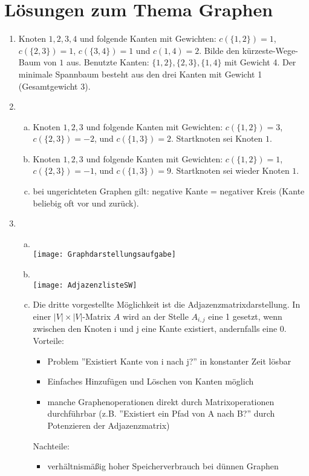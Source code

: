 \documentclass{scrartcl}
\begin{document}
\section*{Lösungen zum Thema Graphen}
\begin{enumerate}[(1)]

\item Knoten $1,2,3,4$ und folgende Kanten mit Gewichten: $c(\{1,2\})=1$, $c(\{2,3\})=1$, $c(\{3,4\})=1$ und $c({1,4})=2$.
Bilde den k\"urzeste-Wege-Baum von $1$ aus. Benutzte Kanten: $\{1,2\}, \{2,3\}, \{1,4\}$ mit Gewicht 4.
Der minimale Spannbaum besteht aus den drei Kanten mit Gewicht 1 (Gesamtgewicht 3).

\item \begin{enumerate}[(a)]
\item Knoten $1,2,3$ und folgende Kanten mit Gewichten: $c(\{1,2\})=3$, $c(\{2,3\})=-2$, und $c(\{1,3\})=2$. Startknoten sei Knoten $1$.
\item Knoten $1,2,3$ und folgende Kanten mit Gewichten: $c(\{1,2\})=1$, $c(\{2,3\})=-1$, und $c(\{1,3\})=9$. Startknoten sei wieder Knoten $1$.
\item bei ungerichteten Graphen gilt: negative Kante = negativer Kreis (Kante beliebig oft vor und zur\"uck).
\end{enumerate}

\item \begin{enumerate}[(a)]
	\item \ \\ \texttt{[image: Graphdarstellungsaufgabe]}
	\item \ \\ \texttt{[image: AdjazenzlisteSW]}
	\item Die dritte vorgestellte Möglichkeit ist die Adjazenzmatrixdarstellung. In einer $|V| \times |V|$-Matrix $A$ wird an der Stelle $A_{i,j}$ eine 1 gesetzt, wenn zwischen den Knoten i und j eine Kante existiert, andernfalls eine 0.\\
	Vorteile:
	\begin{itemize}
		\item Problem ''Existiert Kante von i nach j?'' in konstanter Zeit lösbar
		\item Einfaches Hinzufügen und Löschen von Kanten möglich
		\item manche Graphenoperationen direkt durch Matrixoperationen durchführbar (z.B. ''Existiert ein Pfad von A nach B?'' durch Potenzieren der Adjazenzmatrix)
	\end{itemize}
	Nachteile:
	\begin{itemize}
		\item verhältnismäßig hoher Speicherverbrauch bei dünnen Graphen
	\end{itemize}
\end{enumerate}
\end{enumerate}
\end{document}
